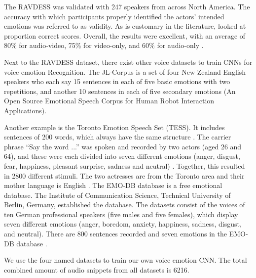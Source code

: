 The RAVDESS was validated with 247 speakers from across North America. The accuracy with which participants properly identified the actors' intended emotions was referred to as validity. As is customary in the literature,  looked at proportion correct scores. Overall, the results were excellent, with an average of 80\% for audio-video, 75\% for video-only, and 60\% for audio-only \cite{livingstone_ryerson_2018}.

Next to the RAVDESS dataset, there exist other voice datasets to train CNNs for voice emotion Recognition. The JL-Corpus is a set of four New Zealand English speakers who each say 15 sentences in each of five basic emotions with two repetitions, and another 10 sentences in each of five secondary emotions (An Open Source Emotional Speech Corpus for Human Robot Interaction Applications).

Another example is the Toronto Emotion Speech Set (TESS). It includes sentences of 200 words,  which always have the same structure \cite{pichora-fuller_toronto_2020}. The carrier phrase ``Say the word ...'' was spoken and recorded by two actors (aged 26 and 64), and these were each divided into seven different emotions (anger, disgust, fear, happiness, pleasant surprise, sadness and neutral) \cite{pichora-fuller_toronto_2020}. Together, this resulted in 2800 different stimuli. The two actresses are from the Toronto area and their mother language is English \cite{pichora-fuller_toronto_2020}. The EMO-DB database is a free emotional database. The Institute of Communication Science, Technical University of Berlin, Germany, established the database. The datasets consist of the voices of ten German professional speakers (five males and five females), which display seven different emotions (anger, boredom,  anxiety, happiness, sadness, disgust, and neutral). There are 800 sentences recorded and seven emotions in the EMO-DB database \cite{burkhardt_database_2005}.

We use the four named datasets to train our own voice emotion CNN. The total combined amount of audio snippets from all datasets is 6216.

